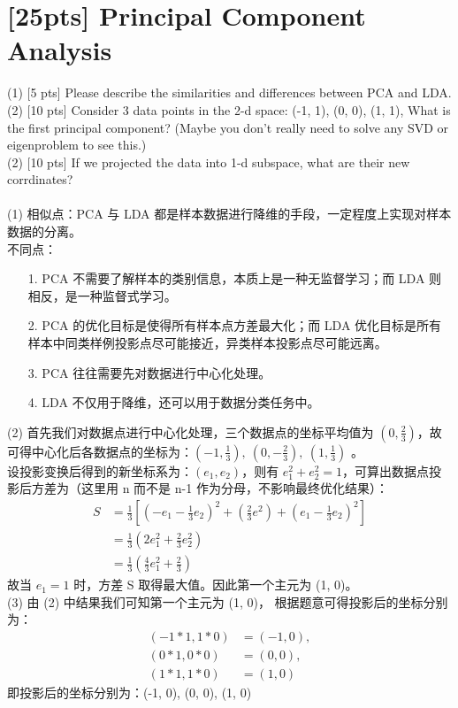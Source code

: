 \documentclass{article}
\begin{document}
\section{[25pts] Principal Component Analysis }
	(1) [5 pts] Please describe the similarities and differences between PCA and LDA.\\
	(2) [10 pts] Consider 3 data points in the 2-d space: (-1, 1), (0, 0), (1, 1), What is the first principal component? (Maybe you don't really need to solve any SVD or eigenproblem to see this.)\\
	(2) [10 pts] If we projected the data into 1-d subspace, what are their new corrdinates? \\\\
	(1) 相似点：PCA 与 LDA 都是样本数据进行降维的手段，一定程度上实现对样本数据的分离。 \\
		不同点：
		\begin{enumerate}
			\item [1.] PCA 不需要了解样本的类别信息，本质上是一种无监督学习；而 LDA 则相反，是一种监督式学习。
			\item [2.] PCA 的优化目标是使得所有样本点方差最大化；而 LDA 优化目标是所有样本中同类样例投影点尽可能接近，异类样本投影点尽可能远离。
			\item [3.] PCA 往往需要先对数据进行中心化处理。
			\item [4.] LDA 不仅用于降维，还可以用于数据分类任务中。
		\end{enumerate}
	(2) 首先我们对数据点进行中心化处理，三个数据点的坐标平均值为 $(0, \frac{2}{3})$，故可得中心化后各数据点的坐标为：$(-1, \frac{1}{3}),\ (0, -\frac{2}{3}),\ (1, \frac{1}{3})$ 。\\
	设投影变换后得到的新坐标系为：$(e_1, e_2)$，则有 $e_1^2 + e_2^2 = 1$，可算出数据点投影后方差为（这里用 n 而不是 n-1 作为分母，不影响最终优化结果）：
	\begin{equation*}
	\begin{aligned}
	S
	&= \frac{1}{3} [(-e_1 - \frac{1}{3}e_2)^2 + (\frac{2}{3}e^2) + (e_1 - \frac{1}{3}e_2)^2] \\
	&= \frac{1}{3} (2e_1^2 + \frac{2}{3}e_2^2) \\
	&= \frac{1}{3} (\frac{4}{3}e_1^2 + \frac{2}{3})
	\end{aligned}
	\end{equation*}
	故当 $e_1 = 1$ 时，方差 S 取得最大值。因此第一个主元为 (1, 0)。\\
	(3) 由 (2) 中结果我们可知第一个主元为 (1, 0)， 根据题意可得投影后的坐标分别为：
	\begin{equation}
	\begin{aligned}
	(-1*1, 1*0) &= (-1, 0), \\
	(0*1, 0*0) &= (0, 0), \\
	(1*1, 1*0) &= (1, 0)
	\end{aligned}
	\end{equation}
	即投影后的坐标分别为：(-1, 0), (0, 0), (1, 0)
\end{document}
